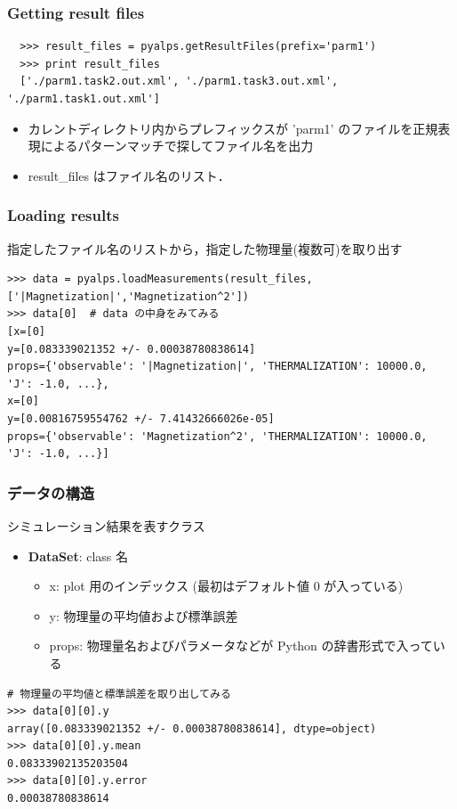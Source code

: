 \begin{frame}[t,fragile]
 \frametitle{Getting result files}
 \begin{lstlisting}
  >>> result_files = pyalps.getResultFiles(prefix='parm1')
  >>> print result_files
  ['./parm1.task2.out.xml', './parm1.task3.out.xml', './parm1.task1.out.xml']
 \end{lstlisting}
 \begin{itemize}
  \item カレントディレクトリ内からプレフィックスが 'parm1' のファイルを正規表現によるパターンマッチで探してファイル名を出力
  \item result\_files はファイル名のリスト．
 \end{itemize}
\end{frame}

\begin{frame}[t,fragile]
\frametitle{Loading results}
指定したファイル名のリストから，指定した物理量(複数可)を取り出す
\begin{lstlisting}
>>> data = pyalps.loadMeasurements(result_files,['|Magnetization|','Magnetization^2'])
>>> data[0]  # data の中身をみてみる
[x=[0]
y=[0.083339021352 +/- 0.00038780838614]
props={'observable': '|Magnetization|', 'THERMALIZATION': 10000.0, 'J': -1.0, ...}, 
x=[0]
y=[0.00816759554762 +/- 7.41432666026e-05]
props={'observable': 'Magnetization^2', 'THERMALIZATION': 10000.0, 'J': -1.0, ...}]
\end{lstlisting}
\end{frame}

\begin{frame}[t,fragile]
\frametitle{データの構造}
シミュレーション結果を表すクラス
\begin{itemize}
\item \textbf{DataSet}: class 名
  \begin{itemize}
  \item x: plot 用のインデックス (最初はデフォルト値 0 が入っている)
  \item y: 物理量の平均値および標準誤差
  \item props: 物理量名およびパラメータなどが Python の辞書形式で入っている
  \end{itemize}
\end{itemize}

\begin{lstlisting}
# 物理量の平均値と標準誤差を取り出してみる
>>> data[0][0].y
array([0.083339021352 +/- 0.00038780838614], dtype=object)
>>> data[0][0].y.mean
0.08333902135203504
>>> data[0][0].y.error
0.00038780838614
\end{lstlisting}
\end{frame}

